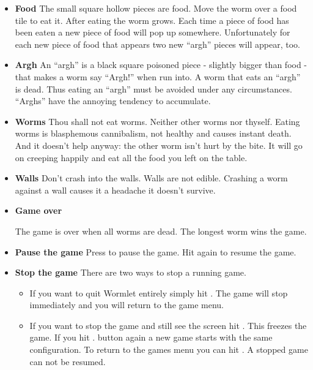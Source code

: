 \begin{itemize}
\item \textbf{Food}
The small square hollow pieces are food. Move the worm over a food tile
to eat it. After eating the worm grows. Each time a piece of food has
been eaten a new piece of food will pop up somewhere. Unfortunately for
each new piece of food that appears two new ``argh'' pieces will
appear, too.
\item \textbf{Argh}
An ``argh'' is a black square poisoned piece {}- slightly bigger than
food {}- that makes a worm say ``Argh!'' when
run into.  A worm that eats an ``argh'' is dead. Thus eating an
``argh'' must be avoided under any circumstances. ``Arghs'' have the
annoying tendency to accumulate. 
\item \textbf{Worms}
Thou shall not eat worms. Neither other worms nor thyself. Eating worms
is blasphemous cannibalism, not healthy and causes instant
death. And it doesn't help anyway: the other worm
isn't hurt by the bite. It will go on creeping happily
and eat all the food you left on the table. 
\item \textbf{Walls}
Don't crash into the walls. Walls are not edible.
Crashing a worm against a wall causes it a headache it
doesn't survive. 
\item \textbf{Game over}

The game is over when all worms are dead. The longest worm wins the
game. 
\item \textbf{Pause the game}
Press
to pause the game. Hit
again to resume the game.

\item \textbf{Stop the game}
There are two ways to stop a running game.

\begin{itemize}
\item If you want to quit Wormlet entirely simply hit
.
The game will stop immediately and you will return to the game menu. 
\item If you want to stop the game and still see the screen hit 
.
This freezes the game. If you hit
.
button again a new game starts with the same configuration. To return to the
games menu you can hit
. A stopped game can not be resumed. 
\end{itemize}
\end{itemize}

